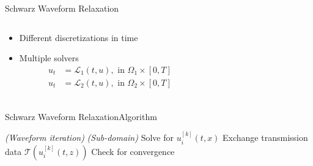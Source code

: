 \documentclass[]{beamer}
\begin{document}
\begin{frame}{Schwarz Waveform Relaxation}

  \begin{columns}

    \begin{column}{.4\textwidth}

      \begin{itemize}
      \item<+-> Different discretizations in time
      \item<+-> Multiple solvers
        \begin{align*}
          u_t &=  \mathcal{L}_1(t,u), \text{ in } \Omega_1\times[0,T]\\
          u_t &=  \mathcal{L}_2(t,u), \text{ in } \Omega_2\times[0,T]\\
        \end{align*}
      \end{itemize}
      
    \end{column}

    \begin{column}{.6\textwidth}

      \begin{figure}
        \centering
      \end{figure}

    \end{column}
  \end{columns}
\end{frame}


\begin{frame}{Schwarz Waveform Relaxation}{Algorithm}
  
  \begin{algorithmic}
    \textit{ (Waveform iteration)}
       \textit{ (Sub-domain)}
          \State Solve for $u_i^{[k]}(t,x)$
        \EndFor
          \State Exchange transmission data $\mathcal{T}(u_i^{[k]}(t, z))$
        \EndFor
      \EndParFor
      \State Check for convergence
    \EndFor
  \end{algorithmic}

\end{frame}
\end{document}

